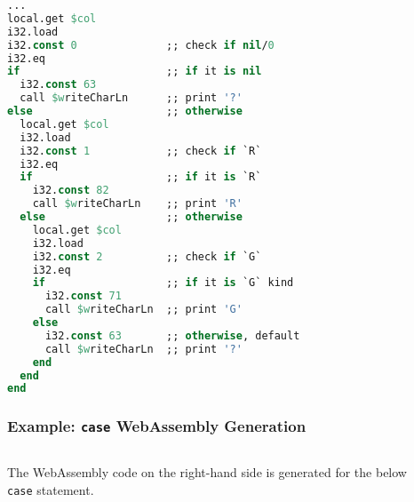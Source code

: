 \documentclass{beamer}
\begin{document}
\begin{lrbox}{\caseGenWat}
\begin{lstlisting}[language=Pascal,basicstyle=\tiny]
...
local.get $col
i32.load
i32.const 0              ;; check if nil/0
i32.eq
if                       ;; if it is nil
  i32.const 63
  call $writeCharLn      ;; print '?'
else                     ;; otherwise
  local.get $col
  i32.load
  i32.const 1            ;; check if `R`
  i32.eq
  if                     ;; if it is `R`
    i32.const 82
    call $writeCharLn    ;; print 'R'
  else                   ;; otherwise
    local.get $col
    i32.load
    i32.const 2          ;; check if `G`
    i32.eq
    if                   ;; if it is `G` kind
      i32.const 71
      call $writeCharLn  ;; print 'G'
    else
      i32.const 63       ;; otherwise, default
      call $writeCharLn  ;; print '?'
    end
  end
end
\end{lstlisting}
\end{lrbox}


\begin{frame}
 \frametitle{Example: \texttt{case} WebAssembly Generation}
    \begin{columns}[T,onlytextwidth]
        \begin{column}{.40\textwidth}
            \begin{minipage}{\textwidth}
                {\footnotesize The WebAssembly code on the right-hand side is generated for the below \texttt{case} statement.}
                \ \\ \ \\ \ \\
                \usebox{\caseGenCode}
            \end{minipage}
        \end{column}
        
        \begin{column}{.55\textwidth}
            \begin{minipage}{\textwidth}
                \usebox{\caseGenWat}
            \end{minipage}
        \end{column}
    \end{columns}
\end{frame}
\end{document}
